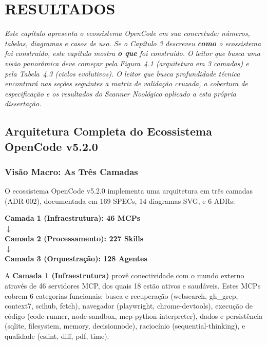 
\chapter{RESULTADOS}
\label{ch:resultados}

{\small\itshape Este capítulo apresenta o ecossistema OpenCode em sua concretude: números, tabelas, diagramas e casos de uso. Se o Capítulo 3 descreveu \textbf{como} o ecossistema foi construído, este capítulo mostra \textbf{o que} foi construído. O leitor que busca uma visão panorâmica deve começar pela Figura~4.1 (arquitetura em 3 camadas) e pela Tabela~4.3 (ciclos evolutivos). O leitor que busca profundidade técnica encontrará nas seções seguintes a matriz de validação cruzada, a cobertura de especificação e os resultados do Scanner Noológico aplicado a esta própria dissertação.}

\section{Arquitetura Completa do Ecossistema OpenCode v5.2.0}

\subsection{Visão Macro: As Três Camadas}

O ecossistema OpenCode v5.2.0 implementa uma arquitetura em três camadas (ADR-002), documentada em 169 SPECs, 14 diagramas SVG, e 6 ADRs:

\begin{center}
\bfseries
Camada 1 (Infraestrutura): 46 MCPs\\
$\downarrow$\\
Camada 2 (Processamento): 227 Skills\\
$\downarrow$\\
Camada 3 (Orquestração): 128 Agentes
\end{center}

A \textbf{Camada 1 (Infraestrutura)} provê conectividade com o mundo externo através de 46 servidores MCP, dos quais 18 estão ativos e saudáveis. Estes MCPs cobrem 6 categorias funcionais: busca e recuperação (websearch, gh\_grep, context7, scihub, fetch), navegador (playwright, chrome-devtools), execução de código (code-runner, node-sandbox, mcp-python-interpreter), dados e persistência (sqlite, filesystem, memory, decisionnode), raciocínio (sequential-thinking), e qualidade (eslint, diff, pdf, time).

